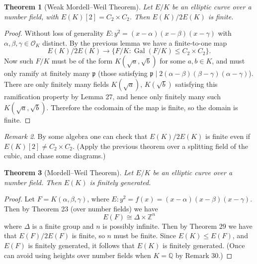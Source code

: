 \documentclass[a4paper]{article}
\theoremstyle{plain}
\newtheorem{theorem}{Theorem}
\theoremstyle{remark}
\newtheorem{numberremark}[theorem]{Remark}
\theoremstyle{definition}
\DeclareMathOperator{\Gal}{Gal}
\newcommand{\p}{\mathfrak{p}}
\renewcommand{\O}{\mathcal{O}}
\newcommand{\Z}{\mathbb{Z}}
\newcommand{\Q}{\mathbb{Q}}
\begin{document}
\begin{theorem}[Weak Mordell--Weil Theorem]
    Let $E/K$ be an elliptic curve over a number field, with
    $E(K)[2]=C_2\times C_2$. Then $E(K)/2E(K)$ is finite.
\end{theorem}

\begin{proof}
    Without loss of generality $E:y^2=(x-\alpha)(x-\beta)(x-\gamma)$ with
    $\alpha,\beta,\gamma\in\O_K$ distinct. By the previous lemma we have a
    finite-to-one map
    \begin{equation*}
        E(K)/2E(K) \to \{F/K:\Gal(F/K)\le C_2\times C_2\}.
    \end{equation*}
    Now such $F/K$ must be of the form $K(\sqrt a,\sqrt b)$ for some $a,b\in K$,
    and must only ramify at finitely many $\p$ (those satisfying
    $\p\mid2(\alpha-\beta)(\beta-\gamma)(\alpha-\gamma)$). There are only
    finitely many fields $K(\sqrt a)$, $K(\sqrt b)$ satisfying this ramification
    property by Lemma 27, and hence only finitely many such
    $K(\sqrt a,\sqrt b)$. Therefore the codomain of the map is finite, so the
    domain is finite.
\end{proof}

\begin{numberremark}
    By some algebra one can check that $E(K)/2E(K)$ is finite even if
    $E(K)[2]\ne C_2\times C_2$. (Apply the previous theorem over a splitting
    field of the cubic, and chase some diagrams.)
\end{numberremark}

\begin{theorem}[Mordell--Weil Theorem]
    Let $E/K$ be an elliptic curve over a number field. Then $E(K)$ is
    finitely generated.
\end{theorem}

\begin{proof}
    Let $F=K(\alpha,\beta,\gamma)$, where
    $E:y^2=f(x)=(x-\alpha)(x-\beta)(x-\gamma)$. Then by Theorem 23 (over number
    fields) we have
    \begin{equation*}
        E(F) \cong \Delta\times\Z^n
    \end{equation*}
    where $\Delta$ is a finite group and $n$ is possibly infinite. Then by
    Theorem 29 we have that $E(F)/2E(F)$ is finite, so $n$ must be finite.
    Since $E(K)\le E(F)$, and $E(F)$ is finitely generated, it follows that
    $E(K)$ is finitely generated. (Once can avoid using heights over number
    fields when $K=\Q$ by Remark 30.)
\end{proof}
\end{document}
